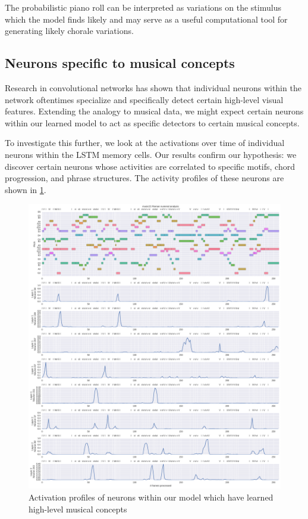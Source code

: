 The probabilistic piano roll can be interpreted as variations on the stimulus
which the model finds likely and may serve as a useful computational tool for
generating likely chorale variations.

\subsection{Neurons specific to musical concepts}

Research in convolutional networks has shown that individual neurons within the
network oftentimes specialize and specifically detect certain high-level visual
features. Extending the analogy to musical data, we
might expect certain neurons within our learned model to act as specific
detectors to certain musical concepts.

To investigate this further, we look at the activations over time of individual
neurons within the LSTM memory cells. Our results confirm our hypothesis: we
discover certain neurons whose activities are correlated to specific motifs,
chord progression, and phrase structures. The activity profiles of these
neurons are shown in \cref{fig:model-analysis-cells-individual}.

\begin{figure}[tb]
    \centering
    \includegraphics[width=1.0\linewidth]{model-analysis-cells-individual.png}
    \caption{Activation profiles of neurons within our model which have learned
    high-level musical concepts}
    \label{fig:model-analysis-cells-individual}
\end{figure}

